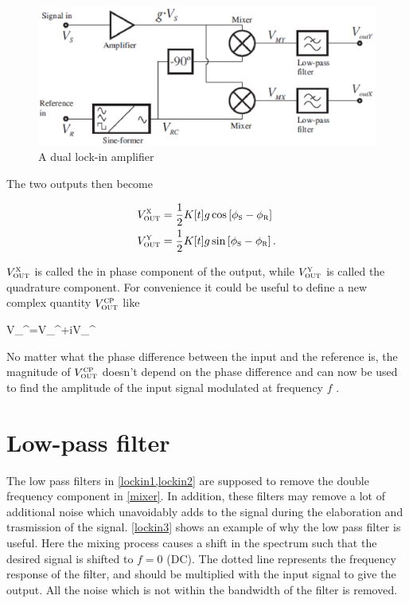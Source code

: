 \begin{figure}[!hbt]\centering
\includegraphics[width=\linewidth, draft=\foto]{eps/lockin2.eps}
\caption{A dual lock-in amplifier}
\label{lockin2}
\end{figure}

The two outputs then become

\begin{align}
V_{\mbox{\footnotesize{\scshape{out}}}}^{\mbox{\footnotesize{\scshape{x}}}}&=\frac{1}{2} K[t] g\cos\left[\phi_{\mbox{\footnotesize{\scshape{s}}}}-\phi_{\mbox{\footnotesize{\scshape{r}}}}\right]
\\
V_{\mbox{\footnotesize{\scshape{out}}}}^{\mbox{\footnotesize{\scshape{y}}}}&=\frac{1}{2} K[t] g\sin\left[\phi_{\mbox{\footnotesize{\scshape{s}}}}-\phi_{\mbox{\footnotesize{\scshape{r}}}}\right].
\end{align}

$V_{\mbox{\footnotesize{\scshape{out}}}}^{\mbox{\footnotesize{\scshape{x}}}}$ is called the in phase component of the output, while $V_{\mbox{\footnotesize{\scshape{out}}}}^{\mbox{\footnotesize{\scshape{y}}}}$ is called the quadrature component. For convenience it could be useful to define a new complex quantity $V_{\mbox{\footnotesize{\scshape{out}}}}^{\mbox{\footnotesize{\scshape{cp}}}}$ like

\mate
V_{}^{}=V_{}^{}+iV_{}^{}
\atem

No matter what the phase difference between the input and the reference is, the magnitude of $V_{\mbox{\footnotesize{\scshape{out}}}}^{\mbox{\footnotesize{\scshape{cp}}}}$ doesn't depend on the phase difference and can now be used to find the amplitude of the input signal modulated at frequency $f$ .

	\section{Low-pass filter}

The low pass filters in \cref{lockin1,lockin2} are supposed to remove the double frequency component in \cref{mixer}. In addition, these filters may remove a lot of additional noise which unavoidably adds to the signal during the elaboration and trasmission of the signal. \cref{lockin3} shows an example of why the low pass filter is useful. Here the mixing process causes a shift in the spectrum such that the desired signal is shifted to $f=0$ (DC). The dotted line represents the frequency response of the filter, and should be multiplied with the input signal to give the output. All the noise which is not within the bandwidth of the filter is removed.

